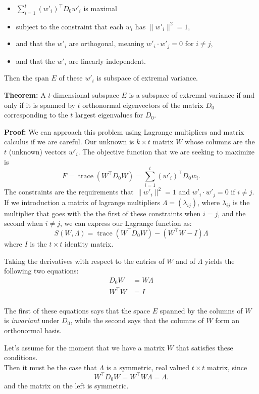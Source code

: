 \documentclass[
]{article}
\providecommand{\tightlist}{%
  \setlength{\itemsep}{0pt}\setlength{\parskip}{0pt}}
\begin{document}
\begin{itemize}
\tightlist
\item
  \(\sum_{i=1}^{t} (w'_{i})^{\intercal}D_{0}w'_{i}\) is maximal
\item
  subject to the constraint that each \(w_{i}\) has \(\|w'_{i}\|^2=1\),
\item
  and that the \(w'_{i}\) are orthogonal, meaning
  \(w'_{i}\cdot w'_{j}=0\) for \(i\not=j\),
\item
  and that the \(w'_{i}\) are linearly independent.
\end{itemize}

Then the span \(E\) of these \(w'_{i}\) is subspace of extremal
variance.

\textbf{Theorem:} A \(t\)-dimensional subspace \(E\) is a subspace of
extremal variance if and only if it is spanned by \(t\) orthonormal
eigenvectors of the matrix \(D_{0}\) corresponding to the \(t\) largest
eigenvalues for \(D_{0}\).

\textbf{Proof:} We can approach this problem using Lagrange multipliers
and matrix calculus if we are careful. Our unknown is \(k\times t\)
matrix \(W\) whose columns are the \(t\) (unknown) vectors \(w'_{i}\).
The objective function that we are seeking to maximize is \[
F = \mathop{trace}(W^{\intercal}D_{0}W) = \sum_{i=1}^{t} (w'_{i})^{\intercal}D_{0}w_{i}.
\] The constraints are the requirements that \(\|w'_{i}\|^2=1\) and
\(w'_{i}\cdot w'_{j}=0\) if \(i\not=j\). If we introduction a matrix of
lagrange multipliers \(\Lambda=(\lambda_{ij})\), where \(\lambda_{ij}\)
is the multiplier that goes with the the first of these constraints when
\(i=j\), and the second when \(i\not=j\), we can express our Lagrange
function as: \[
S(W,\Lambda) = \mathop{trace}(W^{\intercal}D_{0}W) - (W^{\intercal}W-I)\Lambda
\] where \(I\) is the \(t\times t\) identity matrix.

Taking the derivatives with respect to the entries of \(W\) and of
\(\Lambda\) yields the following two equations: \begin{align*}
D_{0}W &= W\Lambda \\
W^{\intercal}W &= I \\
\end{align*}

The first of these equations says that the space \(E\) spanned by the
columns of \(W\) is \emph{invariant} under \(D_{0}\), while the second
says that the columns of \(W\) form an orthonormal basis.

Let's assume for the moment that we have a matrix \(W\) that satisfies
these conditions.\\
Then it must be the case that \(\Lambda\) is a symmetric, real valued
\(t\times t\) matrix, since \[
W^{\intercal}D_{0}W = W^{\intercal}W\Lambda = \Lambda.
\] and the matrix on the left is symmetric.
\end{document}
